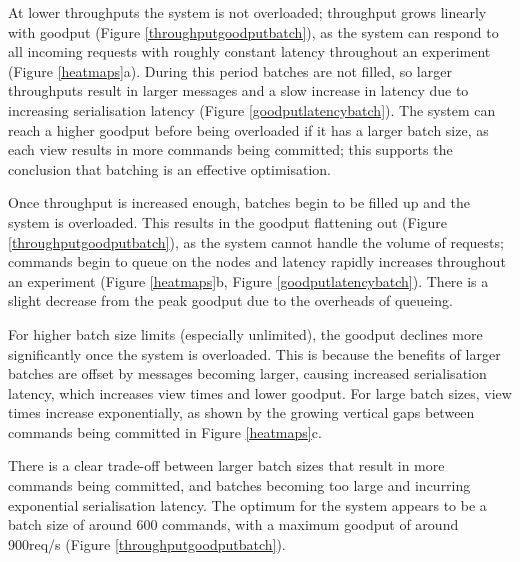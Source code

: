 At lower throughputs the system is not overloaded; throughput grows linearly with goodput (Figure \ref{throughputgoodputbatch}), as the system can respond to all incoming requests with roughly constant latency throughout an experiment (Figure \ref{heatmaps}a). During this period batches are not filled, so larger throughputs result in larger messages and a slow increase in latency due to increasing serialisation latency (Figure \ref{goodputlatencybatch}). The system can reach a higher goodput before being overloaded if it has a larger batch size, as each view results in more commands being committed; this supports the conclusion that batching is an effective optimisation.

Once throughput is increased enough, batches begin to be filled up and the system is overloaded. This results in the goodput flattening out (Figure \ref{throughputgoodputbatch}), as the system cannot handle the volume of requests; commands begin to queue on the nodes and latency rapidly increases throughout an experiment (Figure \ref{heatmaps}b, Figure \ref{goodputlatencybatch}). There is a slight decrease from the peak goodput due to the overheads of queueing.

For higher batch size limits (especially unlimited), the goodput declines more significantly once the system is overloaded. This is because the benefits of larger batches are offset by messages becoming larger, causing increased serialisation latency, which increases view times and lower goodput. For large batch sizes, view times increase exponentially, as shown by the growing vertical gaps between commands being committed in Figure \ref{heatmaps}c.

There is a clear trade-off between larger batch sizes that result in more commands being committed, and batches becoming too large and incurring exponential serialisation latency. The optimum for the system appears to be a batch size of around 600 commands, with a maximum goodput of around 900req/s (Figure \ref{throughputgoodputbatch}).


